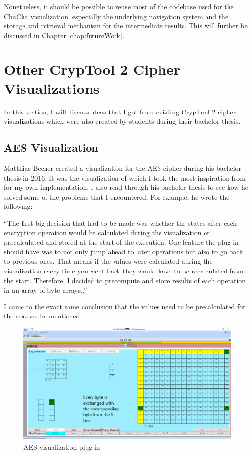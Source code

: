 Nonetheless, it should be possible to reuse most of the codebase used for the ChaCha visualization, especially the underlying navigation system and the storage and retrieval mechanism for the intermediate results. This will further be discussed in Chapter \ref{chap:futureWork}.

\section{Other CrypTool 2 Cipher Visualizations}
\label{sec:otherCT2CipherVisualizations}

In this section, I will discuss ideas that I got from existing CrypTool 2 cipher visualizations which were also created by students during their bachelor thesis.

\subsection{AES Visualization}
\label{sec:aesVisualization}

Matthias Becher created a visualization for the AES cipher during his bachelor thesis in 2016. It was the visualization of which I took the most inspiration from for my own implementation. I also read through his bachelor thesis to see how he solved some of the problems that I encountered. For example, he wrote the following:

``The first big decision that had to be made was whether the states after each encryption operation would be calculated during the visualization or precalculated and stored at the start of the execution. One feature the plug-in should have was to not only jump ahead to later operations but also to go back to previous ones. That means if the values were calculated during the visualization every time you went back they would have to be recalculated from the start. Therefore, I decided to precompute and store results of each operation in an array of byte arrays..'' \cite{aesthesis}

I came to the exact same conclusion that the values need to be precalculated for the reasons he mentioned.

\begin{figure}
\centering
\includegraphics[width=\textwidth]{figures/ct2/aes.png}
\caption{AES visualization plug-in}
\label{fig:aes}
\end{figure}

